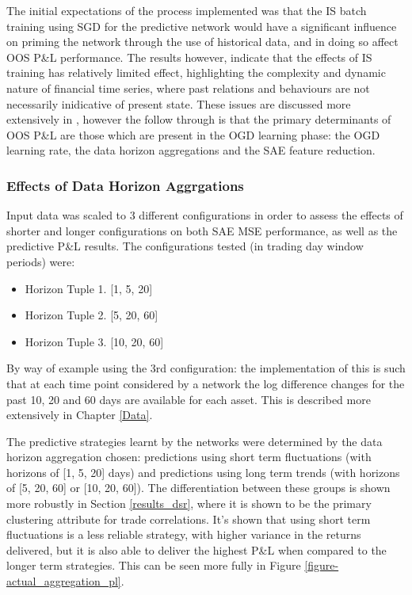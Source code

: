 \documentclass[a4paper,11pt,oneside]{article}
\theoremstyle{plain}
\theoremstyle{definition}
\begin{document}
	The initial expectations of the process implemented was that the IS batch training using SGD for the predictive network would have a significant influence on priming the network through the use of historical data, and in doing so affect OOS P\&L performance. The results however, indicate that the effects of IS training has relatively limited effect, highlighting the complexity and dynamic nature of financial time series, where past relations and behaviours are not necessarily inidicative of present state. These issues are discussed more extensively in , however the follow through is that the primary determinants of OOS P\&L are those which are present in the OGD learning phase: the OGD learning rate, the data horizon aggregations and the SAE feature reduction.\newline
	
	
	\subsubsection{Effects of Data Horizon Aggrgations}
	
	Input data was scaled to 3 different configurations in order to assess the effects of shorter and longer configurations on both SAE MSE performance, as well as the predictive P\&L results. The configurations tested (in trading day window periods) were:
	
	\begin{itemize}
		\item[] Horizon Tuple 1. [1, 5, 20]
		\item[] Horizon Tuple 2. [5, 20, 60]
		\item[] Horizon Tuple 3. [10, 20, 60]
	\end{itemize}
	
	By way of example using the 3rd configuration: the implementation of this is such that at each time point considered by a network the log difference changes for the past 10, 20 and 60 days are available for each asset. This is described more extensively in Chapter \ref{Data}.\newline
	
	The predictive strategies learnt by the networks were determined by the data horizon aggregation chosen: predictions using short term fluctuations (with horizons of [1, 5, 20] days) and predictions using long term trends (with horizons of [5, 20, 60] or [10, 20, 60]). The differentiation between these groups is shown more robustly in Section \ref{results_dsr}, where it is shown to be the primary clustering attribute for trade correlations. It's shown that using short term fluctuations is a less reliable strategy, with higher variance in the returns delivered, but it is also able to deliver the highest P\&L when compared to the longer term strategies. This can be seen more fully in Figure \ref{figure-actual_aggregation_pl}. \newline
\end{document}

